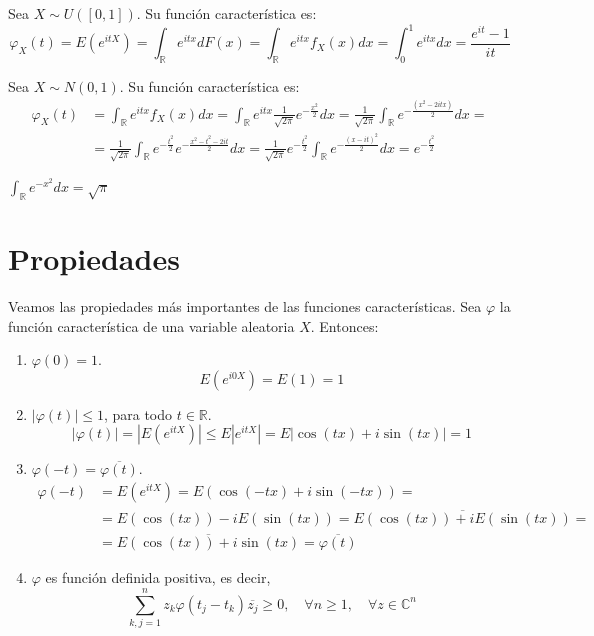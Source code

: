 \begin{example}
    Sea $X \sim U([0, 1])$.
    Su función característica es:
    $$\varphi_X(t) = E(e^{itX}) = \int_\mathbb{R} e^{itx}dF(x) = \int_\mathbb{R} e^{itx}f_X(x)dx = \int_0^1 e^{itx}dx = \frac{e^{it}-1}{it}$$
\end{example}

\begin{example}
    Sea $X \sim N(0, 1)$.
    Su función característica es:
    \begin{align*}
        \varphi_X(t) & = \int_\mathbb{R} e^{itx}f_X(x)dx = \int_\mathbb{R} e^{itx} \frac{1}{\sqrt{2\pi}}e^{-\frac{x^2}{2}}dx = \frac{1}{\sqrt{2\pi}} \int_\mathbb{R} e^{-\frac{(x^2-2itx)}{2}}dx =                     \\
                     & = \frac{1}{\sqrt{2\pi}} \int_\mathbb{R} e^{-\frac{t^2}{2}}e^{-\frac{x^2-t^2-2it}{2}}dx = \frac{1}{\sqrt{2\pi}}e^{-\frac{t^2}{2}} \int_\mathbb{R} e^{-\frac{(x-it)^2}{2}}dx = e^{-\frac{t^2}{2}}
    \end{align*}

    \begin{note}
        $\int_\mathbb{R} e^{-x^2}dx = \sqrt{\pi}$
    \end{note}
\end{example}

\section{Propiedades}
Veamos las propiedades más importantes de las funciones características.
Sea $\varphi$ la función característica de una variable aleatoria $X$.
Entonces:
\begin{enumerate}
    \item $\varphi(0) = 1$.
          $$E(e^{i0X}) = E(1) = 1$$
    \item $|\varphi(t)| \leq 1$, para todo $t \in \mathbb{R}$.
          $$|\varphi(t)| = |E(e^{itX})| \leq E|e^{itX}| = E|\cos(tx) + i\sin(tx)| = 1$$
    \item $\varphi(-t) = \overline{\varphi(t)}$.
          \begin{align*}
              \varphi(-t) & = E(e^{itX}) = E(\cos(-tx) + i\sin(-tx)) =                             \\
                          & = E(\cos(tx)) - iE(\sin(tx)) = \overline{E(\cos(tx)) + iE(\sin(tx))} = \\
                          & = \overline{E(\cos(tx)) + i\sin(tx)} = \overline{\varphi(t)}
          \end{align*}
    \item $\varphi$ es función definida positiva, es decir,
          $$\sum_{k,j=1}^n z_k\varphi(t_j-t_k)\overline{z_j} \geq 0, \quad \forall n \geq 1, \quad \forall z \in \mathbb{C}^n$$
\end{enumerate}

